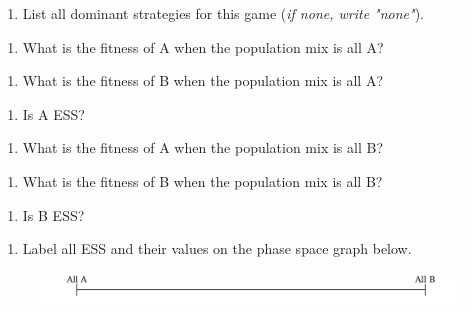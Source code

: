 \documentclass[11pt]{article}
\begin{document}
\begin{enumerate}[label=\alph*), start=5]
\item  List all dominant strategies for this game (\textit{if none, write "none"}). \hfill \raisebox{-1ex}{\rule{4.2cm}{1pt}}

\end{enumerate}
\begin{enumerate}[label=\alph*), start=6]
\item  What is the fitness of A when the population mix is all A? \hfill \raisebox{-1ex}{\rule{4.2cm}{1pt}}

\end{enumerate}
\begin{enumerate}[label=\alph*), start=7]
\item  What is the fitness of B when the population mix is all A? \hfill \raisebox{-1ex}{\rule{4.2cm}{1pt}}

\end{enumerate}
\begin{enumerate}[label=\alph*), start=8]
\item  Is A ESS? \hfill \raisebox{-1ex}{\rule{4.2cm}{1pt}}

\end{enumerate}
\begin{enumerate}[label=\alph*), start=9]
\item  What is the fitness of A when the population mix is all B? \hfill \raisebox{-1ex}{\rule{4.2cm}{1pt}}

\end{enumerate}
\begin{enumerate}[label=\alph*), start=10]
\item  What is the fitness of B when the population mix is all B? \hfill \raisebox{-1ex}{\rule{4.2cm}{1pt}}

\end{enumerate}
\begin{enumerate}[label=\alph*), start=11]
\item  Is B ESS? \hfill \raisebox{-1ex}{\rule{4.2cm}{1pt}}

\end{enumerate}
\begin{enumerate}[label=\alph*), start=12]
\item  Label all ESS and their values on the phase space graph below.
\end{enumerate}

\begin{figure}[h!]
\centering
\includegraphics[width=\textwidth]{Images/phase_space_graph.png}
\end{figure}
\end{document}
